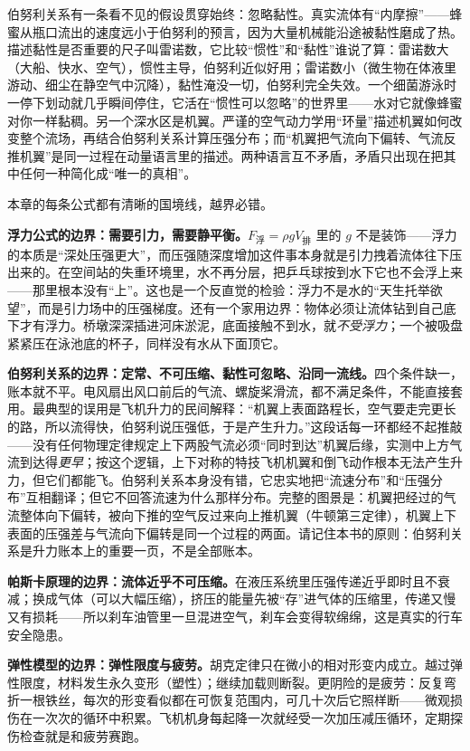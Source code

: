 \begin{challenge}
伯努利关系有一条看不见的假设贯穿始终：忽略黏性。真实流体有“内摩擦”——蜂蜜从瓶口流出的速度远小于伯努利的预言，因为大量机械能沿途被黏性磨成了热。描述黏性是否重要的尺子叫雷诺数，它比较“惯性”和“黏性”谁说了算：雷诺数大（大船、快水、空气），惯性主导，伯努利近似好用；雷诺数小（微生物在体液里游动、细尘在静空气中沉降），黏性淹没一切，伯努利完全失效。一个细菌游泳时一停下划动就几乎瞬间停住，它活在“惯性可以忽略”的世界里——水对它就像蜂蜜对你一样黏稠。另一个深水区是机翼。严谨的空气动力学用“环量”描述机翼如何改变整个流场，再结合伯努利关系计算压强分布；而“机翼把气流向下偏转、气流反推机翼”是同一过程在动量语言里的描述。两种语言互不矛盾，矛盾只出现在把其中任何一种简化成“唯一的真相”。
\end{challenge}


\begin{mainline}
本章的每条公式都有清晰的国境线，越界必错。

\textbf{浮力公式的边界：需要引力，需要静平衡。}\(F_{\text{浮}}=\rho g V_{\text{排}}\) 里的 \(g\) 不是装饰——浮力的本质是“深处压强更大”，而压强随深度增加这件事本身就是引力拽着流体往下压出来的。在空间站的失重环境里，水不再分层，把乒乓球按到水下它也不会浮上来——那里根本没有“上”。这也是一个反直觉的检验：浮力不是水的“天生托举欲望”，而是引力场中的压强梯度。还有一个家用边界：物体必须让流体钻到自己底下才有浮力。桥墩深深插进河床淤泥，底面接触不到水，就\emph{不受浮力}；一个被吸盘紧紧压在泳池底的杯子，同样没有水从下面顶它。

\textbf{伯努利关系的边界：定常、不可压缩、黏性可忽略、沿同一流线。}四个条件缺一，账本就不平。电风扇出风口前后的气流、螺旋桨滑流，都不满足条件，不能直接套用。最典型的误用是飞机升力的民间解释：“机翼上表面路程长，空气要走完更长的路，所以流得快，伯努利说压强低，于是产生升力。”这段话每一环都经不起推敲——没有任何物理定律规定上下两股气流必须“同时到达”机翼后缘，实测中上方气流到达得\emph{更早}；按这个逻辑，上下对称的特技飞机机翼和倒飞动作根本无法产生升力，但它们都能飞。伯努利关系本身没有错，它忠实地把“流速分布”和“压强分布”互相翻译；但它不回答流速为什么那样分布。完整的图景是：机翼把经过的气流整体向下偏转，被向下推的空气反过来向上推机翼（牛顿第三定律），机翼上下表面的压强差与气流向下偏转是同一个过程的两面。请记住本书的原则：伯努利关系是升力账本上的重要一页，不是全部账本。

\textbf{帕斯卡原理的边界：流体近乎不可压缩。}在液压系统里压强传递近乎即时且不衰减；换成气体（可以大幅压缩），挤压的能量先被“存”进气体的压缩里，传递又慢又有损耗——所以刹车油管里一旦混进空气，刹车会变得软绵绵，这是真实的行车安全隐患。

\textbf{弹性模型的边界：弹性限度与疲劳。}胡克定律只在微小的相对形变内成立。越过弹性限度，材料发生永久变形（塑性）；继续加载则断裂。更阴险的是疲劳：反复弯折一根铁丝，每次的形变看似都在可恢复范围内，可几十次后它照样断——微观损伤在一次次的循环中积累。飞机机身每起降一次就经受一次加压减压循环，定期探伤检查就是和疲劳赛跑。
\end{mainline}

